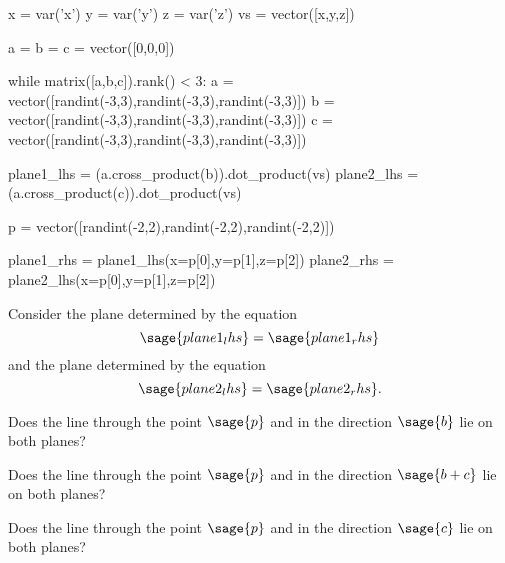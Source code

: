 \documentclass{ximera}
\author{Jim Fowler}
\begin{document}
\makerandom

\begin{sagesilent}
  x = var('x')
  y = var('y')
  z = var('z')
  vs = vector([x,y,z])
  
  a = b = c = vector([0,0,0])

  while matrix([a,b,c]).rank() < 3:
    a = vector([randint(-3,3),randint(-3,3),randint(-3,3)])
    b = vector([randint(-3,3),randint(-3,3),randint(-3,3)])
    c = vector([randint(-3,3),randint(-3,3),randint(-3,3)])

  plane1_lhs = (a.cross_product(b)).dot_product(vs)
  plane2_lhs = (a.cross_product(c)).dot_product(vs)

  p = vector([randint(-2,2),randint(-2,2),randint(-2,2)])

  plane1_rhs = plane1_lhs(x=p[0],y=p[1],z=p[2])
  plane2_rhs = plane2_lhs(x=p[0],y=p[1],z=p[2])
\end{sagesilent}

\begin{exercise}
  Consider the plane determined by the equation
  \[
    \sage{plane1_lhs} = \sage{plane1_rhs}
  \]
  and the plane determined by the equation
  \[
    \sage{plane2_lhs} = \sage{plane2_rhs}.
  \]

  \begin{question}
    Does the line through the point $\sage{p}$ and in the direction
    $\sage{b}$ lie on both planes?
    \begin{multipleChoice}
    \end{multipleChoice}
  \end{question}

  \begin{question}
    Does the line through the point $\sage{p}$ and in the direction
    $\sage{b+c}$ lie on both planes?
    \begin{multipleChoice}
    \end{multipleChoice}
  \end{question}
  
  \begin{question}
    Does the line through the point $\sage{p}$ and in the direction
    $\sage{c}$ lie on both planes?
    \begin{multipleChoice}
    \end{multipleChoice}    
  \end{question}
  
\end{exercise}
\end{document}
